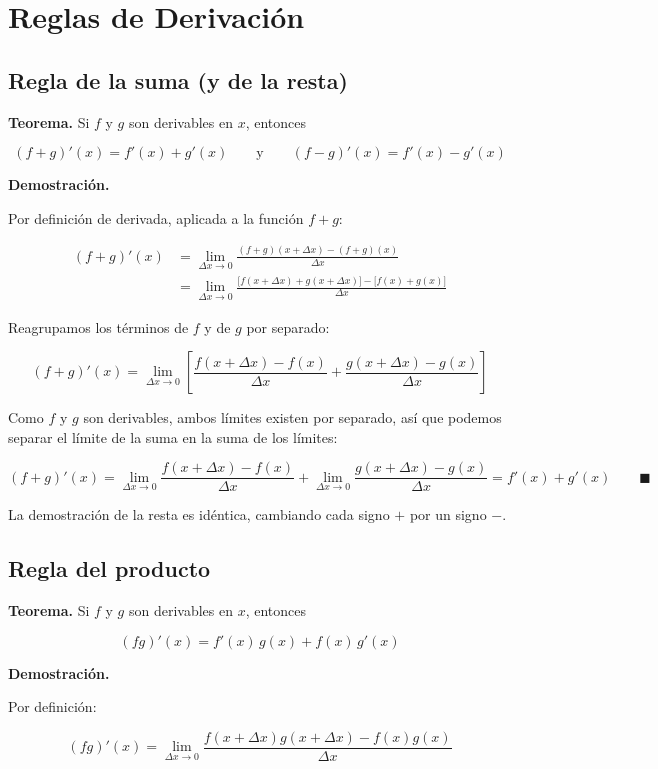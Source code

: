 \documentclass[12pt,tikz,border=5pt]{article}
\begin{document}
\section{Reglas de Derivación}


\subsection{Regla de la suma (y de la resta)}

\textbf{Teorema.} Si $f$ y $g$ son derivables en $x$, entonces

$$(f+g)'(x) = f'(x) + g'(x) \qquad \text{y} \qquad (f-g)'(x) = f'(x) - g'(x)$$

\textbf{Demostración.}

Por definición de derivada, aplicada a la función $f+g$:

\begin{align*}
(f+g)'(x) &= \lim_{\Delta x\to 0} \frac{(f+g)(x+\Delta x)-(f+g)(x)}{\Delta x} \\[4pt]
&= \lim_{\Delta x\to 0} \frac{\big[f(x+\Delta x)+g(x+\Delta x)\big]-\big[f(x)+g(x)\big]}{\Delta x}
\end{align*}

Reagrupamos los términos de $f$ y de $g$ por separado:

$$(f+g)'(x) = \lim_{\Delta x\to 0}\left[\frac{f(x+\Delta x)-f(x)}{\Delta x} + \frac{g(x+\Delta x)-g(x)}{\Delta x}\right]$$

Como $f$ y $g$ son derivables, ambos límites existen por separado, así que
podemos separar el límite de la suma en la suma de los límites:

$$(f+g)'(x) = \lim_{\Delta x\to 0}\frac{f(x+\Delta x)-f(x)}{\Delta x} + \lim_{\Delta x\to 0}\frac{g(x+\Delta x)-g(x)}{\Delta x} = f'(x)+g'(x) \qquad \blacksquare$$

La demostración de la resta es idéntica, cambiando cada signo $+$ por un
signo $-$.

\subsection{Regla del producto}

\textbf{Teorema.} Si $f$ y $g$ son derivables en $x$, entonces

$$(fg)'(x) = f'(x)\,g(x) + f(x)\,g'(x)$$

\textbf{Demostración.}

Por definición:

$$(fg)'(x) = \lim_{\Delta x\to 0}\frac{f(x+\Delta x)g(x+\Delta x) - f(x)g(x)}{\Delta x}$$
\end{document}
